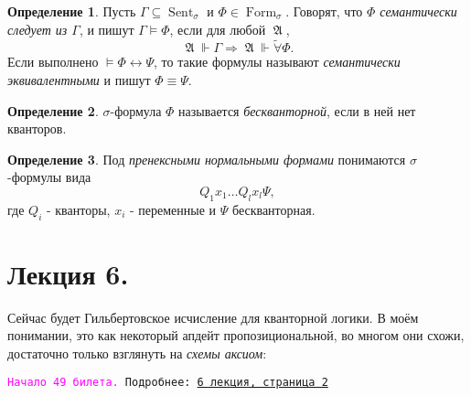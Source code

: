 \documentclass[a4paper,100pt]{article}
\theoremstyle{indented}
\theoremstyle{definition}
\newtheorem{defn}{Определение}
\theoremstyle{remark}
\DeclareMathOperator{\form}{Form}
\DeclareMathOperator{\Sent}{Sent}
\DeclareMathOperator{\GA}{\mathfrak{A}}
\begin{document}
\begin{defn}
  Пусть $\Gamma \subseteq \Sent_\sigma$ и $\Phi \in \form_\sigma$. Говорят, что \textit{$\Phi$ семантически следует из $\Gamma$}, и пишут $\Gamma \vDash \Phi$, если для любой $\GA$, 
  \[
    \GA \Vdash \Gamma \Longrightarrow \GA \Vdash \tilde{\forall}\Phi. 
  \]
  Если выполнено $\vDash \Phi \leftrightarrow \Psi$, то такие формулы называют \textit{семантически эквивалентными} и пишут $\Phi \equiv \Psi$. 
\end{defn}

\begin{defn}
  $\sigma$-формула $\Phi$ называется \textit{бескванторной}, если в ней нет кванторов.
\end{defn}

\begin{defn}
  Под \textit{пренексными нормальными формами} понимаются $\sigma$-формулы вида 
  \[
    Q_1 x_1 \ldots Q_l x_l \Psi,
  \]
  где $Q_i$ - кванторы, $x_i$ - переменные и $\Psi$ бескванторная.
\end{defn}

\section{Лекция 6.}

Сейчас будет Гильбертовское исчисление для кванторной логики. В моём понимании, это как некоторый апдейт пропозициональной, во многом они схожи, достаточно только взглянуть на \textit{схемы аксиом}:

\hrulefill

\texttt{\hypertarget{b49}{\textcolor{magenta}{Начало 49 билета.}} Подробнее: \href{http://www.mi-ras.ru/~speranski/courses/logic-1-2021-spring/slides_6.pdf}{6 лекция, страница 2}} 
\end{document}
